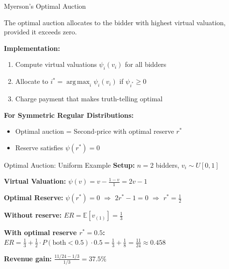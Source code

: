 \documentclass[xcolor={x11names}, aspectratio=169 ]{beamer}
\DeclareMathOperator*{\argmax}{arg\,max}
\newcommand{\E}{\mathbb{E}}
\begin{document}
\begin{frame}{Myerson's Optimal Auction}
\begin{theorem}[Myerson 1981]
The optimal auction allocates to the bidder with highest virtual valuation, provided it exceeds zero.
\end{theorem}

\textbf{Implementation:}
\begin{enumerate}
  \item Compute virtual valuations $\psi_i(v_i)$ for all bidders
  \item Allocate to $i^* = \argmax_i \psi_i(v_i)$ if $\psi_{i^*} \geq 0$
  \item Charge payment that makes truth-telling optimal
\end{enumerate}

\textbf{For Symmetric Regular Distributions:}
\begin{itemize}
  \item Optimal auction = Second-price with optimal reserve $r^*$
  \item Reserve satisfies $\psi(r^*) = 0$
\end{itemize}
\end{frame}

\begin{frame}{Optimal Auction: Uniform Example}
\textbf{Setup:} $n=2$ bidders, $v_i \sim U[0,1]$

\textbf{Virtual Valuation:} $\psi(v) = v - \frac{1-v}{1} = 2v - 1$

\textbf{Optimal Reserve:} $\psi(r^*) = 0$ $\Rightarrow$ $2r^* - 1 = 0$ $\Rightarrow$ $r^* = \frac{1}{2}$

\begin{proofbox}
\textbf{Without reserve:}
$ER = \E[v_{(1)}] = \frac{1}{3}$

\textbf{With optimal reserve $r^* = 0.5$:}
$ER = \frac{1}{3} + \frac{1}{2} \cdot P(\text{both} < 0.5) \cdot 0.5 = \frac{1}{3} + \frac{1}{8} = \frac{11}{24} \approx 0.458$

\textbf{Revenue gain:} $\frac{11/24 - 1/3}{1/3} = 37.5\%$
\end{proofbox}
\end{frame}
\end{document}

